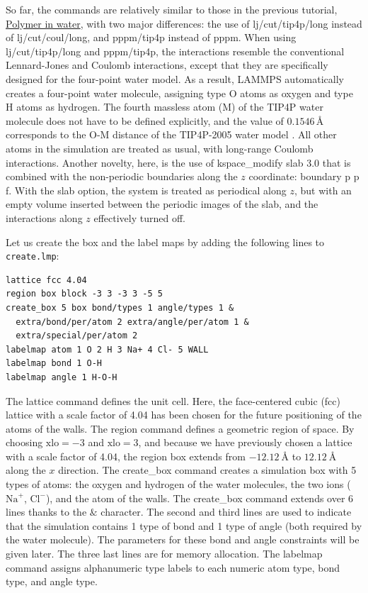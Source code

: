 \documentclass[9pt,tutorial]{livecoms}
\newcommand{\lmpcmd}[1]{\hspace{0pt}\colorbox{listing}{\textcolor{command}{\small{#1}}}\hspace{0pt}} %
\newcommand{\flecmd}[1]{\textcolor{command}{\texttt{#1}}} %
\begin{document}
So far, the commands are relatively similar to those in the previous tutorial,
\hyperref[all-atoms-label]{Polymer in water}, with two major differences: the use
of \lmpcmd{lj/cut/tip4p/long} instead of \lmpcmd{lj/cut/coul/long}, and \lmpcmd{pppm/tip4p}
instead of \lmpcmd{pppm}.  When using \lmpcmd{lj/cut/tip4p/long} and \lmpcmd{pppm/tip4p},
the interactions resemble the conventional Lennard-Jones and Coulomb interactions,
except that they are specifically designed for the four-point water model.  As a result,
LAMMPS automatically creates a four-point water molecule, assigning type O
atoms as oxygen and type H atoms as hydrogen.  The fourth massless atom (M) of the
TIP4P water molecule does not have to be defined explicitly, and the value of
$0.1546\,\text{$\text{\AA{}}$}$ corresponds to the O-M distance of the
TIP4P-2005 water model \cite{abascal2005general}.  All other atoms in the simulation
are treated as usual, with long-range Coulomb interactions.  Another novelty, here, is
the use of \lmpcmd{kspace\_modify slab 3.0} that is combined with the non-periodic
boundaries along the $z$ coordinate: \lmpcmd{boundary p p f}.  With the \lmpcmd{slab}
option, the system is treated as periodical along $z$, but with an empty volume inserted
between the periodic images of the slab, and the interactions along $z$ effectively turned off.

Let us create the box and the label maps by adding the following lines to \flecmd{create.lmp}:
\begin{lstlisting}
lattice fcc 4.04
region box block -3 3 -3 3 -5 5
create_box 5 box bond/types 1 angle/types 1 &
  extra/bond/per/atom 2 extra/angle/per/atom 1 &
  extra/special/per/atom 2
labelmap atom 1 O 2 H 3 Na+ 4 Cl- 5 WALL
labelmap bond 1 O-H
labelmap angle 1 H-O-H
\end{lstlisting}
The \lmpcmd{lattice} command defines the unit cell.  Here, the face-centered cubic (fcc) lattice
with a scale factor of 4.04 has been chosen for the future positioning of the atoms
of the walls.  The \lmpcmd{region} command defines a geometric region of space.  By choosing
$\text{xlo}=-3$ and $\text{xlo}=3$, and because we have previously chosen a lattice with a scale
factor of 4.04, the region box extends from $-12.12~\text{\AA{}}$ to $12.12~\text{\AA{}}$
along the $x$ direction.  The \lmpcmd{create\_box} command creates a simulation box with
5 types of atoms: the oxygen and hydrogen of the water molecules, the two ions ($\text{Na}^+$,
$\text{Cl}^-$), and the atom of the walls.  The \lmpcmd{create\_box} command extends over 6
lines thanks to the $\&$ character.  The second and third lines are used to indicate that the
simulation contains 1 type of bond and 1 type of angle (both required by the water molecule).
The parameters for these bond and angle constraints will be given later.  The three last
lines are for memory allocation.  The \lmpcmd{labelmap} command assigns alphanumeric type labels
to each numeric atom type, bond type, and angle type.
\end{document}
